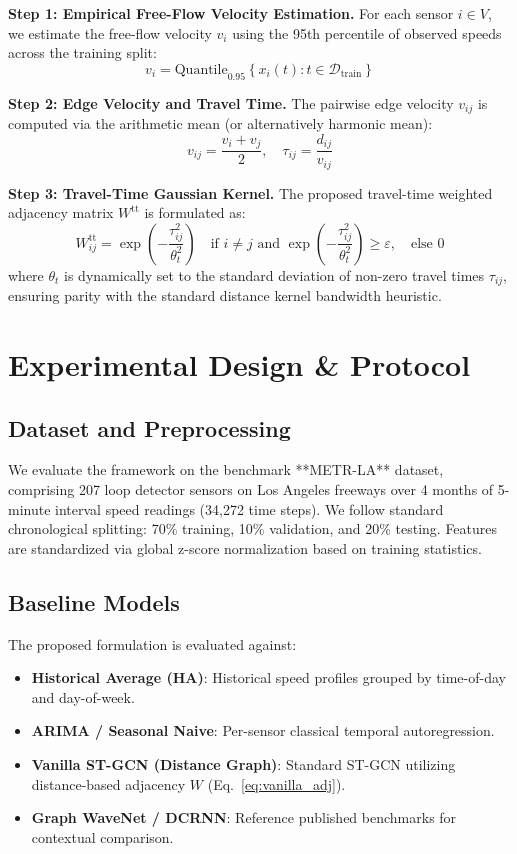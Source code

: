 \documentclass[pdflatex,sn-mathphys-num]{sn-jnl}
\theoremstyle{thmstyleone}
\theoremstyle{thmstyletwo}
\theoremstyle{thmstylethree}
\begin{document}
\textbf{Step 1: Empirical Free-Flow Velocity Estimation.}
For each sensor $i \in V$, we estimate the free-flow velocity $v_i$ using the 95th percentile of observed speeds across the training split:
\begin{equation}
v_i = \text{Quantile}_{0.95}\left\{ x_i(t) : t \in \mathcal{D}_{\text{train}} \right\}
\end{equation}

\textbf{Step 2: Edge Velocity and Travel Time.}
The pairwise edge velocity $v_{ij}$ is computed via the arithmetic mean (or alternatively harmonic mean):
\begin{equation}
v_{ij} = \frac{v_i + v_j}{2}, \quad \tau_{ij} = \frac{d_{ij}}{v_{ij}}
\end{equation}

\textbf{Step 3: Travel-Time Gaussian Kernel.}
The proposed travel-time weighted adjacency matrix $W^{\text{tt}}$ is formulated as:
\begin{equation}
W^{\text{tt}}_{ij} = \exp\left( -\frac{\tau_{ij}^2}{\theta_t^2} \right) \quad \text{if } i \neq j \text{ and } \exp\left( -\frac{\tau_{ij}^2}{\theta_t^2} \right) \ge \varepsilon, \quad \text{else } 0
\label{eq:tt_adj}
\end{equation}
where $\theta_t$ is dynamically set to the standard deviation of non-zero travel times $\tau_{ij}$, ensuring parity with the standard distance kernel bandwidth heuristic.

\section{Experimental Design \& Protocol}\label{sec:experiments}

\subsection{Dataset and Preprocessing}
We evaluate the framework on the benchmark **METR-LA** dataset, comprising 207 loop detector sensors on Los Angeles freeways over 4 months of 5-minute interval speed readings (34,272 time steps). We follow standard chronological splitting: 70\% training, 10\% validation, and 20\% testing. Features are standardized via global z-score normalization based on training statistics.

\subsection{Baseline Models}
The proposed formulation is evaluated against:
\begin{itemize}
    \item \textbf{Historical Average (HA)}: Historical speed profiles grouped by time-of-day and day-of-week.
    \item \textbf{ARIMA / Seasonal Naive}: Per-sensor classical temporal autoregression.
    \item \textbf{Vanilla ST-GCN (Distance Graph)}: Standard ST-GCN utilizing distance-based adjacency $W$ (Eq.~\ref{eq:vanilla_adj}).
    \item \textbf{Graph WaveNet / DCRNN}: Reference published benchmarks for contextual comparison.
\end{itemize}
\end{document}
